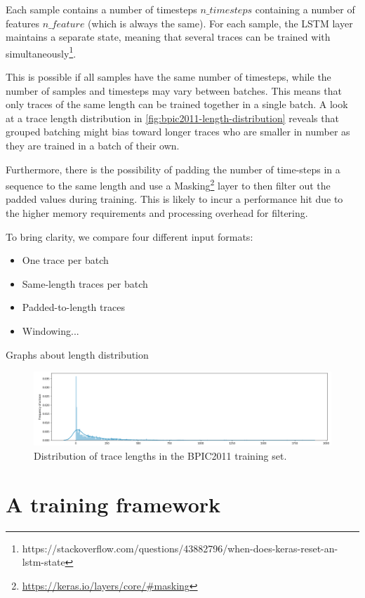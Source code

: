 Each sample contains a number of timesteps $n\_timesteps$ containing a number of features $n\_feature$ (which is always the same). For each sample, the LSTM layer maintains a separate state, meaning that several traces can be trained with simultaneously\footnote{https://stackoverflow.com/questions/43882796/when-does-keras-reset-an-lstm-state}.

This is possible if all samples have the same number of timesteps, while the number of samples and timesteps may vary between batches. This means that only traces of the same length can be trained together in a single batch. A look at a trace length distribution in \autoref{fig:bpic2011-length-distribution} reveals that grouped batching might bias toward longer traces who are smaller in number as they are trained in a batch of their own.

Furthermore, there is the possibility of padding the number of time-steps in a sequence to the same length and use a Masking\footnote{\url{https://keras.io/layers/core/\#masking}} layer to then filter out the padded values during training. This is likely to incur a performance hit due to the higher memory requirements and processing overhead for filtering.

To bring clarity, we compare four different input formats:
\begin{itemize}
    \item One trace per batch
    \item Same-length traces per batch
    \item Padded-to-length traces
    \item Windowing...
\end{itemize}

Graphs about length distribution
\begin{figure}
    \centering
    \includegraphics[width=\textwidth]{gfx/frequency-distribution.png}
    \caption{Distribution of trace lengths in the BPIC2011 training set.}
    \label{fig:bpic2011-length-distribution}
\end{figure}


\section{A training framework}
\label{sec:contrib:training-framework}

